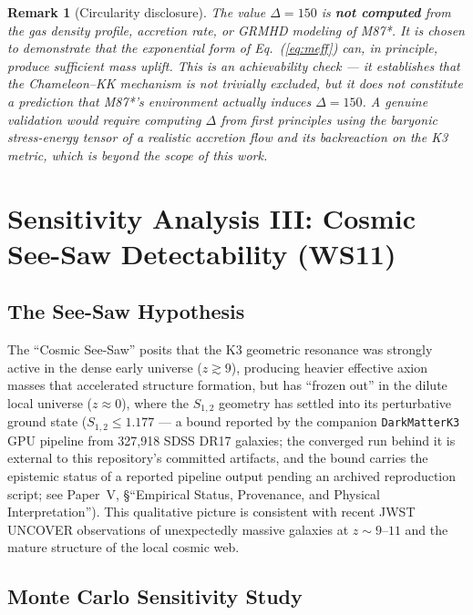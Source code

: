 \documentclass[12pt]{article}
\newtheorem{remark}{Remark}
\begin{document}
\begin{remark}[Circularity disclosure]
\label{rem:ws10_circularity}
The value $\Delta = 150$ is \textbf{not computed} from the gas density profile, accretion rate, or GRMHD modeling of M87*.
It is chosen to demonstrate that the exponential form of Eq.~(\ref{eq:meff}) can, in principle, produce sufficient mass uplift.
This is an \emph{achievability check} --- it establishes that the Chameleon--KK mechanism is not trivially excluded, but it does not constitute a prediction that M87*'s environment actually induces $\Delta = 150$.
A genuine validation would require computing $\Delta$ from first principles using the baryonic stress-energy tensor of a realistic accretion flow and its backreaction on the K3 metric, which is beyond the scope of this work.
\end{remark}

\section{Sensitivity Analysis III: Cosmic See-Saw Detectability (WS11)}
\label{sec:ws11}

\subsection{The See-Saw Hypothesis}

The ``Cosmic See-Saw'' posits that the K3 geometric resonance was strongly active in the dense early universe ($z \gtrsim 9$), producing heavier effective axion masses that accelerated structure formation, but has ``frozen out'' in the dilute local universe ($z \approx 0$), where the $S_{1,2}$ geometry has settled into its perturbative ground state ($S_{1,2} \leq 1.177$ --- a bound reported by the companion \texttt{DarkMatterK3} GPU pipeline from 327,918 SDSS DR17 galaxies; the converged run behind it is external to this repository's committed artifacts, and the bound carries the epistemic status of a reported pipeline output pending an archived reproduction script; see Paper~V, \S``Empirical Status, Provenance, and Physical Interpretation'').
This qualitative picture is consistent with recent JWST UNCOVER observations of unexpectedly massive galaxies at $z \sim 9$--$11$ and the mature structure of the local cosmic web.

\subsection{Monte Carlo Sensitivity Study}
\end{document}
